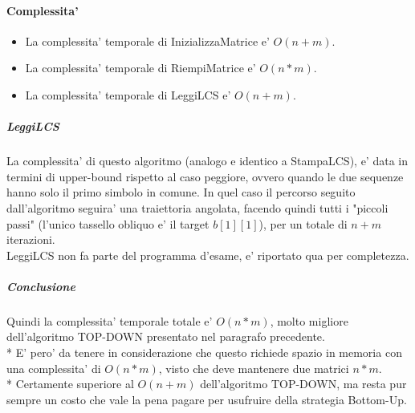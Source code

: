 \paragraph{Complessita'}

\begin{itemize}
    \item La complessita' temporale di InizializzaMatrice e' $O(n+m)$.
    \item La complessita' temporale di RiempiMatrice e' $O(n*m)$.
    \item La complessita' temporale di LeggiLCS e' $O(n+m)$.
\end{itemize}

\subparagraph{LeggiLCS}
La complessita' di questo algoritmo (analogo e identico a StampaLCS), e' data in termini di upper-bound rispetto al caso peggiore, ovvero quando le due sequenze hanno solo il primo simbolo in comune. In quel caso il percorso seguito dall'algoritmo seguira' una traiettoria angolata, facendo quindi tutti i "piccoli passi" (l'unico tassello obliquo e' il target $b[1][1]$), per un totale di $n+m$ iterazioni. \\
LeggiLCS non fa parte del programma d'esame, e' riportato qua per completezza.

\subparagraph{Conclusione}
Quindi la complessita' temporale totale e' $O(n*m)$, molto migliore dell'algoritmo TOP-DOWN presentato nel paragrafo precedente. \\*
E' pero' da tenere in considerazione che questo richiede spazio in memoria con una complessita' di $O(n * m)$, visto che deve mantenere due matrici $n*m$. \\*
Certamente superiore al $O(n + m)$ dell'algoritmo TOP-DOWN, ma resta pur sempre un costo che vale la pena pagare per usufruire della strategia Bottom-Up.

